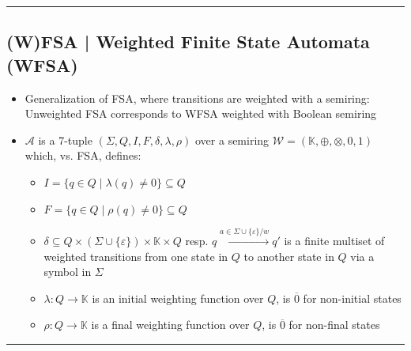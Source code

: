 {\color{black}\hrule height 0.001mm}

\subsection*{(W)FSA | Weighted Finite State Automata (WFSA)}
\begin{itemize}
    \item Generalization of FSA, where transitions are weighted with a semiring: Unweighted FSA corresponds to WFSA weighted with Boolean semiring
    \item $\mathcal{A}$ is a 7-tuple $(\Sigma, Q, I, F, \delta, \lambda, \rho)$ over a semiring $\mathcal{W} = (\mathbb{K}, \oplus, \otimes, 0, 1)$ which, vs. FSA, defines:
    \begin{itemize}
        \item $I = \{q \in Q \mid \lambda(q) \neq 0\} \subseteq Q$
        \item $F = \{q \in Q \mid \rho(q) \neq 0\} \subseteq Q$ 
        \item $\delta \subseteq Q \times (\Sigma \cup \{\varepsilon\}) \times \mathbb{K} \times Q$ resp. $q \xrightarrow{a \in \Sigma \cup \{\varepsilon\} / w} q'$ is a finite multiset of weighted transitions from one state in $Q$ to another state in $Q$ via a symbol in $\Sigma$
        \item $\lambda : Q \to \mathbb{K}$ is an initial weighting function over $Q$, is $\overline{0}$ for non-initial states
        \item $\rho : Q \to \mathbb{K}$ is a final weighting function over $Q$, is $\overline{0}$ for non-final states
    \end{itemize}
\end{itemize}

{\color{black}\hrule height 0.001mm}

